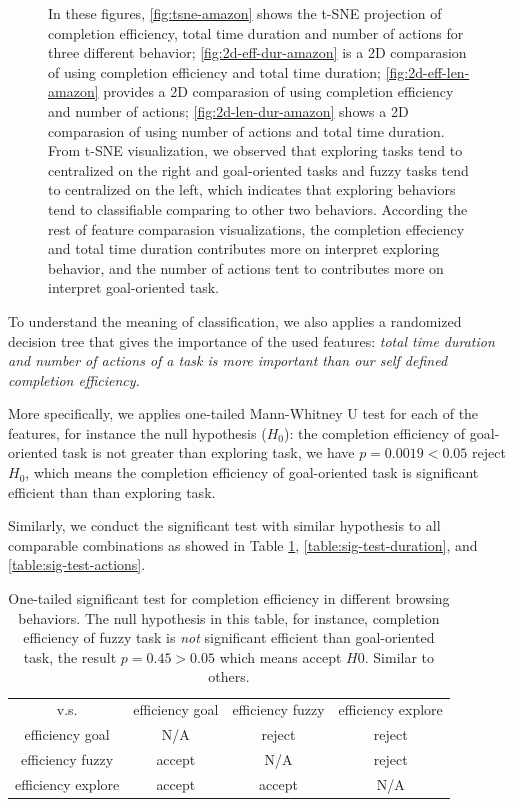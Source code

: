 \begin{figure}[H]
    \caption{In these figures, \ref{fig:tsne-amazon} shows the t-SNE projection
    of completion efficiency, total time duration and number of actions for three different behavior;
    \ref{fig:2d-eff-dur-amazon} is a 2D comparasion of using completion efficiency and total time duration;
    \ref{fig:2d-eff-len-amazon} provides a 2D comparasion of using completion efficiency and number of actions;
    \ref{fig:2d-len-dur-amazon} shows a 2D comparasion of using number of actions and total time duration.
    From t-SNE visualization, we observed that exploring tasks tend to centralized on the right and goal-oriented
    tasks and fuzzy tasks tend to centralized on the left, which indicates that exploring behaviors tend to classifiable
    comparing to other two behaviors. According the rest of feature comparasion visualizations, the completion effeciency and total time duration
    contributes more on interpret exploring behavior, and the number of actions tent to
    contributes more on interpret goal-oriented task.}
    \label{fig:general-amazon}
\end{figure}

To understand the meaning of classification, we also applies a randomized decision tree
that gives the importance of the used features: \emph{total time duration and number of actions
of a task is more important than our self defined completion efficiency.}

More specifically, we applies one-tailed Mann-Whitney U test for each of the features,
for instance the null hypothesis ($H_0$): the completion efficiency of goal-oriented task 
is not greater than exploring task, we have $p = 0.0019 < 0.05$ reject $H_0$, which means
the completion efficiency of goal-oriented task is significant efficient than than exploring task.

Similarly, we conduct the significant test with similar hypothesis 
to all comparable combinations as showed in Table \ref{table:sig-test-efficiency}, \ref{table:sig-test-duration}, and \ref{table:sig-test-actions}.

\begin{table}[H]
    \small
    \centering
    \caption{One-tailed significant test for completion efficiency in different browsing behaviors.
    The null hypothesis in this table, for instance, completion efficiency of fuzzy task
    is \emph{not} significant efficient than goal-oriented task, the result $p=0.45>0.05$ which means
    accept $H0$. Similar to others.}
        \begin{tabular}{cccc}
            \toprule
              v.s.             & efficiency goal & efficiency fuzzy & efficiency explore \\
            efficiency goal    & N/A             & reject           & reject             \\
            efficiency fuzzy   & accept          & N/A              & reject             \\
            efficiency explore & accept          & accept           & N/A                \\
            \bottomrule
        \end{tabular}
        \label{table:sig-test-efficiency}
\end{table}

